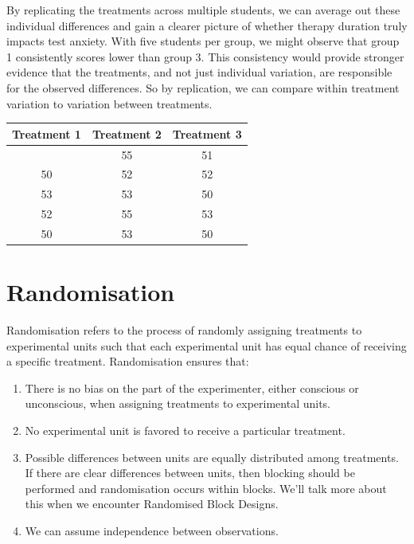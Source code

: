 \documentclass[
  letterpaper,
]{book}
\begin{document}
By replicating the treatments across multiple students, we can average
out these individual differences and gain a clearer picture of whether
therapy duration truly impacts test anxiety. With five students per
group, we might observe that group 1 consistently scores lower than
group 3. This consistency would provide stronger evidence that the
treatments, and not just individual variation, are responsible for the
observed differences. So by replication, we can compare within treatment
variation to variation between treatments.

\begin{longtable}[]{@{}ccc@{}}
\toprule\noalign{}
Treatment 1 & Treatment 2 & Treatment 3 \\
\midrule\noalign{}
\endhead
\bottomrule\noalign{}
\endlastfoot
48 & 55 & 51 \\
50 & 52 & 52 \\
53 & 53 & 50 \\
52 & 55 & 53 \\
50 & 53 & 50 \\
\end{longtable}

\section*{Randomisation}\label{randomisation}


Randomisation refers to the process of randomly assigning treatments to
experimental units such that each experimental unit has equal chance of
receiving a specific treatment. Randomisation ensures that:

\begin{enumerate}
\def\labelenumi{\arabic{enumi}.}
\item
  There is no bias on the part of the experimenter, either conscious or
  unconscious, when assigning treatments to experimental units.
\item
  No experimental unit is favored to receive a particular treatment.
\item
  Possible differences between units are equally distributed among
  treatments. If there are clear differences between units, then
  blocking should be performed and randomisation occurs within blocks.
  We'll talk more about this when we encounter Randomised Block Designs.
\item
  We can assume independence between observations.
\end{enumerate}
\end{document}
